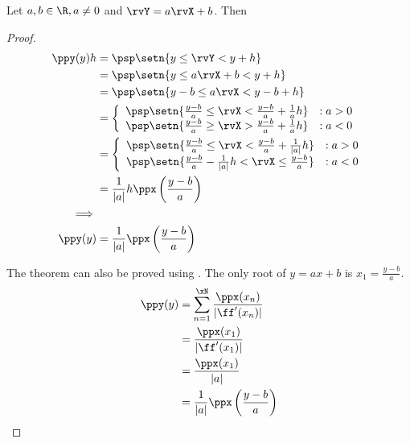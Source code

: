 \begin{proposition}
Let $a,b\in\R, a\ne 0$ and $\rvY=a\rvX+b$. Then
\end{proposition}
\begin{proof}
\begin{align*}
  \ppy(y)h
    &=  \psp\setn{y\le\rvY < y+h}
  \\&=  \psp\setn{y\le a\rvX+b < y+h}
  \\&=  \psp\setn{y-b\le a\rvX < y-b+h}
  \\&=  \left\{\begin{array}{ll}
          \psp\setn{\frac{y-b}{a}\le\rvX < \frac{y-b}{a}+\frac{1}{a}h} &: a>0 \\
          \psp\setn{\frac{y-b}{a}\ge\rvX > \frac{y-b}{a}+\frac{1}{a}h} &: a<0
        \end{array}\right.
  \\&=  \left\{\begin{array}{ll}
          \psp\setn{\frac{y-b}{a}\le\rvX < \frac{y-b}{a}+\frac{1}{|a|}h} &: a>0 \\
          \psp\setn{\frac{y-b}{a}-\frac{1}{|a|}h <\rvX \le \frac{y-b}{a}} &: a<0
        \end{array}\right.
  \\&=  \frac{1}{|a|}h \ppx\left(\frac{y-b}{a}\right)
\\\implies
\\
  \ppy(y)
    &=  \frac{1}{|a|} \ppx\left(\frac{y-b}{a}\right)
\end{align*}

The theorem can also be proved using .
The only root of $y=ax+b$ is $x_1=\frac{y-b}{a}$.
\begin{align*}
  \ppy(y)
    &= \sum_{n=1}^{\xN} \frac{\ppx(x_n)}{|\ff'(x_n)|}
  \\&= \frac{\ppx(x_1)}{|\ff'(x_1)|}
  \\&= \frac{\ppx(x_1)}{|a|}
  \\&= \frac{1}{|a|}\ppx\left(\frac{y-b}{a}\right)
\end{align*}
\end{proof}

